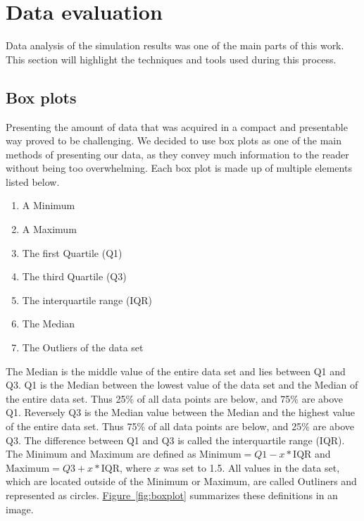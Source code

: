 \section{Data evaluation}
Data analysis of the simulation results was one of the main parts of this work. This section will highlight the techniques and tools used during this process.

\subsection{Box plots}
Presenting the amount of data that was acquired in a compact and presentable way proved to be challenging. We decided to use box plots
as one of the main methods of presenting our data, as they convey much information to the reader without being too overwhelming.
Each box plot is made up of multiple elements listed below.\newpage

\begin{enumerate}[label=$\bullet$]
	\item A Minimum
	\item A Maximum
	\item The first Quartile (Q1)
	\item The third Quartile (Q3)
	\item The interquartile range (IQR)
	\item The Median
	\item The Outliers of the data set
\end{enumerate}


The Median is the middle value of the entire data set and lies between Q1 and Q3. Q1  is the Median 
between the lowest value of the data set and the Median of the entire data set. Thus 25\% of all data points are below, and 75\%
are above Q1. Reversely Q3 is the Median value between the Median and the
highest value of the entire data set. Thus 75\% of all data points are below, and 25\% are above Q3.
The difference between Q1 and Q3 is called the interquartile range (IQR). The Minimum and Maximum are
defined as $\text{Minimum} = Q1 - x*\text{IQR}$ and $\text{Maximum} = Q3 + x*\text{IQR}$, where $x$ was set to 1.5.
All values in the data set, which are located outside of the Minimum or Maximum, are called Outliners and represented as circles.
\hyperref[fig:boxplot]{Figure~\ref*{fig:boxplot}} summarizes these definitions in an image.


